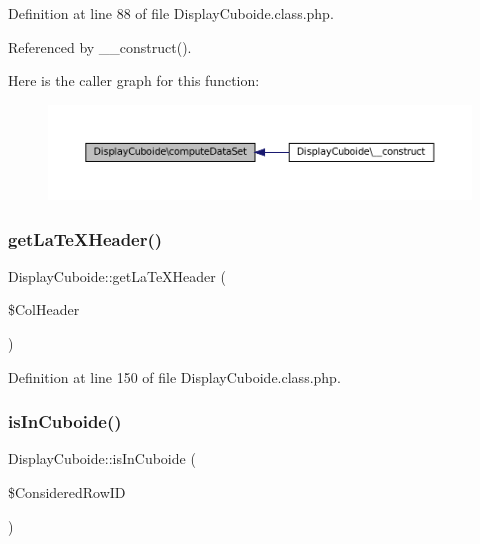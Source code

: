 Definition at line 88 of file Display\+Cuboide.\+class.\+php.



Referenced by \+\_\+\+\_\+construct().

Here is the caller graph for this function\+:\nopagebreak
\begin{figure}[H]
\begin{center}
\leavevmode
\includegraphics[width=350pt]{class_display_cuboide_a40d7338cee6f9b27e2772864b71edcab_icgraph}
\end{center}
\end{figure}
\mbox{\label{class_display_cuboide_a4e383e8a460e9785065e27d4db15f1dd}} 
\subsubsection{\texorpdfstring{get\+La\+Te\+X\+Header()}{getLaTeXHeader()}}
{\footnotesize\ttfamily Display\+Cuboide\+::get\+La\+Te\+X\+Header (\begin{DoxyParamCaption}\item[{}]{\$\+Col\+Header }\end{DoxyParamCaption})\hspace{0.3cm}{\ttfamily [protected]}}



Definition at line 150 of file Display\+Cuboide.\+class.\+php.

\mbox{\label{class_display_cuboide_a0ff1d1fb20501b079f5597ebfaa6f9cf}} 
\subsubsection{\texorpdfstring{is\+In\+Cuboide()}{isInCuboide()}}
{\footnotesize\ttfamily Display\+Cuboide\+::is\+In\+Cuboide (\begin{DoxyParamCaption}\item[{}]{\$\+Considered\+Row\+ID }\end{DoxyParamCaption})\hspace{0.3cm}{\ttfamily [protected]}}



